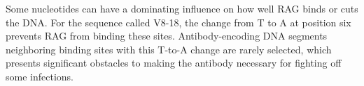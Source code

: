 \documentclass[11pt, oneside]{article}   	%
\begin{document}
Some nucleotides can have a dominating influence on how well RAG binds or cuts
the DNA. For the sequence called V8-18, the change from T to A at position six prevents
RAG from binding these sites. Antibody-encoding DNA segments neighboring binding sites with this T-to-A change
are rarely selected, which presents significant obstacles to making the antibody necessary for fighting off some infections.
\end{document}
